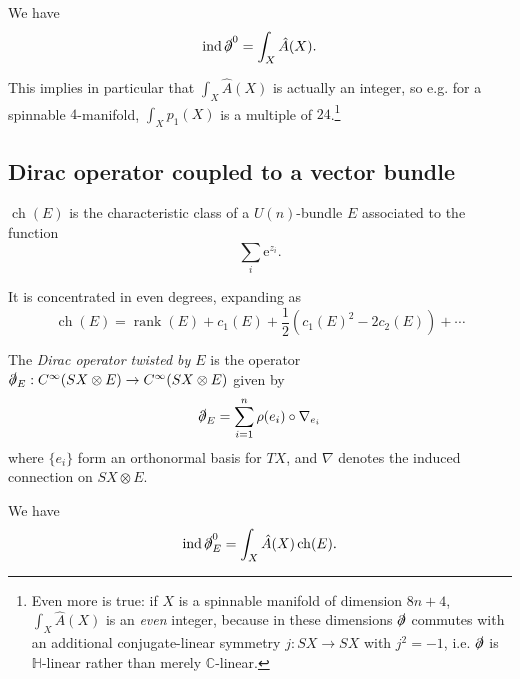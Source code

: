 \documentclass[12pt,letterpaper,reqno]{article}
\numberwithin{equation}{section}
\newcommand{\C}{\ensuremath{\mathbb C}}
\newcommand{\bbH}{\ensuremath{\mathbb H}}
\newcommand{\half}{\ensuremath{\frac{1}{2}}}
\newcommand{\dirac}{\slashed{\partial}}
\newcommand{\e}{{\mathrm e}}
\newcommand{\ti}[1]{\textit{#1}}
\DeclareMathOperator{\ch}{ch}
\DeclareMathOperator{\rank}{rank}
\DeclareMathOperator{\ind}{ind}
\newcommand{\fixme}[1]{{\color{orange}{[#1]}}}
\begin{document}
\begin{thm}
\label{thm:atiyah-singer}
We have
\begin{equation}
  \ind \dirac^0 = \int_X \hat A(X).
\end{equation}
\end{thm}
This implies in particular that $\int_X \hat A(X)$ is actually an integer, so
e.g. for a spinnable $4$-manifold, $\int_X p_1(X)$ is a multiple of $24$.\footnote{Even more is true: if $X$ is a spinnable
manifold of dimension $8n+4$, $\int_X \hat A(X)$ is an \ti{even} integer,
because in these dimensions $\dirac$ commutes with an additional
conjugate-linear symmetry $j: SX \to SX$ with $j^2 = -1$, 
i.e. $\dirac$ is $\bbH$-linear rather than merely
$\C$-linear.}


\subsection{Dirac operator coupled to a vector bundle} \label{sec:dirac-coupled}

\fixme{characteristic classes for $U(n)$-bundles}

\begin{defn} $\ch(E)$ is the characteristic class of a
$U(n)$-bundle $E$ associated to the function \fixme{check factors}
\begin{equation}
  \sum_i \e^{z_i}.
\end{equation}
\end{defn}
It is concentrated in even degrees, expanding as
\begin{equation}
  \ch(E) = \rank(E) + c_1(E) + \half(c_1(E)^2 - 2 c_2(E)) + \cdots
\end{equation}

\begin{defn} The \ti{Dirac operator twisted by $E$} is 
the operator $\dirac_E: C^\infty(SX \otimes E) \to C^\infty(SX \otimes E)$
given by
\begin{equation}
  \dirac_E = \sum_{i=1}^n \rho(e_i) \circ \nabla_{e_i}
\end{equation}
where $\{e_i\}$ form an orthonormal basis for $TX$, and $\nabla$ denotes the induced
connection on $SX \otimes E$.
\end{defn}

\begin{thm}
\label{thm:atiyah-singer-twisted}
We have
\begin{equation}
  \ind \dirac^0_E = \int_X \hat A(X) \ch(E).
\end{equation}
\end{thm}
\end{document}
